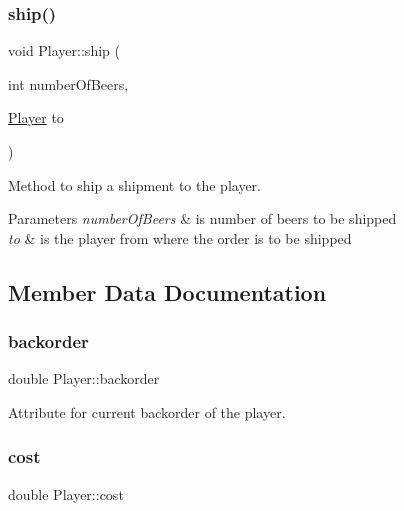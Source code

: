 \subsubsection{\texorpdfstring{ship()}{ship()}}
{\footnotesize\ttfamily void Player\+::ship (\begin{DoxyParamCaption}\item[{int}]{number\+Of\+Beers,  }\item[{\hyperlink{class_player}{Player}}]{to }\end{DoxyParamCaption})}



Method to ship a shipment to the player. 


\begin{DoxyParams}{Parameters}
{\em number\+Of\+Beers} & is number of beers to be shipped \\
\hline
{\em to} & is the player from where the order is to be shipped \\
\hline
\end{DoxyParams}


\subsection{Member Data Documentation}
\mbox{\label{class_player_a691751190c6389e1aef1b5b949cb11b7}} 
\subsubsection{\texorpdfstring{backorder}{backorder}}
{\footnotesize\ttfamily double Player\+::backorder\hspace{0.3cm}{\ttfamily [private]}}



Attribute for current backorder of the player. 

\mbox{\label{class_player_a7477b3893f2805a36042e96b4aeb2151}} 
\subsubsection{\texorpdfstring{cost}{cost}}
{\footnotesize\ttfamily double Player\+::cost\hspace{0.3cm}{\ttfamily [private]}}



